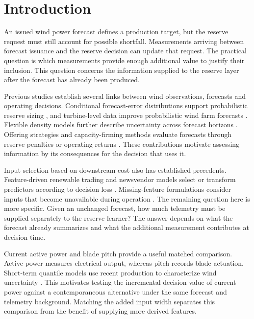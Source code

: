 \section{Introduction}

An issued wind power forecast defines a production target, but the reserve request must still account for possible shortfall. Measurements arriving between forecast issuance and the reserve decision can update that request. The practical question is which measurements provide enough additional value to justify their inclusion. This question concerns the information supplied to the reserve layer after the forecast has already been produced.

Previous studies establish several links between wind observations, forecasts and operating decisions. Conditional forecast-error distributions support probabilistic reserve sizing \cite{bruninx2014}, and turbine-level data improve probabilistic wind farm forecasts \cite{gilbert2020}. Flexible density models further describe uncertainty across forecast horizons \cite{wen2022}. Offering strategies and capacity-firming methods evaluate forecasts through reserve penalties or operating returns \cite{soares2016,dumas2022}. These contributions motivate assessing information by its consequences for the decision that uses it.

Input selection based on downstream cost also has established precedents. Feature-driven renewable trading and newsvendor models select or transform predictors according to decision loss \cite{munoz2020featuredriven,serrano2024featureselection}. Missing-feature formulations consider inputs that become unavailable during operation \cite{kuhnau2023missing}. The remaining question here is more specific. Given an unchanged forecast, how much telemetry must be supplied separately to the reserve learner? The answer depends on what the forecast already summarizes and what the additional measurement contributes at decision time.

Current active power and blade pitch provide a useful matched comparison. Active power measures electrical output, whereas pitch records blade actuation. Short-term quantile models use recent production to characterize wind uncertainty \cite{pritchard2011shortterm}. This motivates testing the incremental decision value of current power against a contemporaneous alternative under the same forecast and telemetry background. Matching the added input width separates this comparison from the benefit of supplying more derived features.

